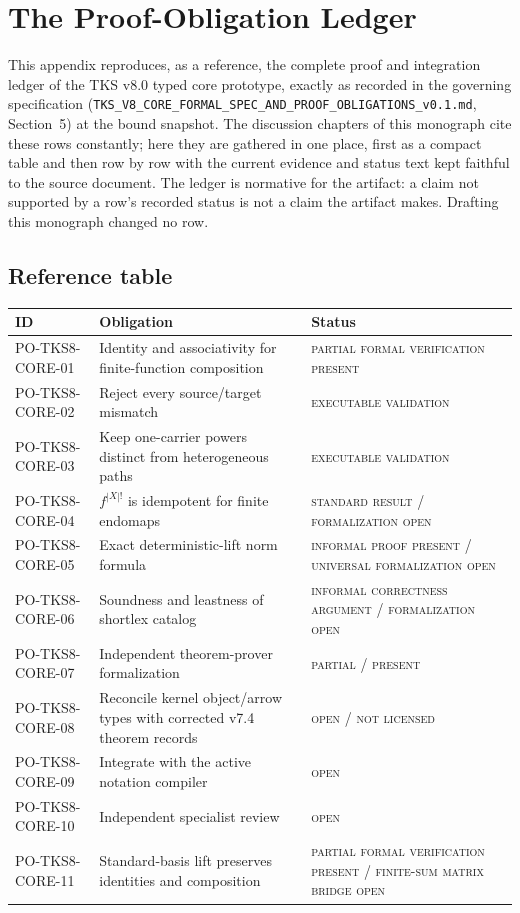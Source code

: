 \chapter{The Proof-Obligation Ledger}\label{appB:ledger}

This appendix reproduces, as a reference, the complete proof and
integration ledger of the TKS v8.0 typed core prototype, exactly as
recorded in the governing specification
(\texttt{TKS\_V8\_CORE\_FORMAL\_SPEC\_AND\_PROOF\_OBLIGATIONS\_v0.1.md},
Section~5) at the bound snapshot. The discussion chapters of this
monograph cite these rows constantly; here they are gathered in one
place, first as a compact table and then row by row with the current
evidence and status text kept faithful to the source document. The
ledger is normative for the artifact: a claim not supported by a row's
recorded status is not a claim the artifact makes. Drafting this
monograph changed no row.

\section{Reference table}\label{appB:sec:table}

\begin{longtable}{@{}lp{6.2cm}p{4.6cm}@{}}
\toprule
ID & Obligation & Status \\
\midrule
\endhead
PO-TKS8-CORE-01 & Identity and associativity for finite-function composition & \textsc{partial formal verification present} \\
\addlinespace
PO-TKS8-CORE-02 & Reject every source/target mismatch & \textsc{executable validation} \\
\addlinespace
PO-TKS8-CORE-03 & Keep one-carrier powers distinct from heterogeneous paths & \textsc{executable validation} \\
\addlinespace
PO-TKS8-CORE-04 & $f^{|X|!}$ is idempotent for finite endomaps & \textsc{standard result / formalization open} \\
\addlinespace
PO-TKS8-CORE-05 & Exact deterministic-lift norm formula & \textsc{informal proof present / universal formalization open} \\
\addlinespace
PO-TKS8-CORE-06 & Soundness and leastness of shortlex catalog & \textsc{informal correctness argument / formalization open} \\
\addlinespace
PO-TKS8-CORE-07 & Independent theorem-prover formalization & \textsc{partial / present} \\
\addlinespace
PO-TKS8-CORE-08 & Reconcile kernel object/arrow types with corrected v7.4 theorem records & \textsc{open / not licensed} \\
\addlinespace
PO-TKS8-CORE-09 & Integrate with the active notation compiler & \textsc{open} \\
\addlinespace
PO-TKS8-CORE-10 & Independent specialist review & \textsc{open} \\
\addlinespace
PO-TKS8-CORE-11 & Standard-basis lift preserves identities and composition & \textsc{partial formal verification present / finite-sum matrix bridge open} \\
\bottomrule
\end{longtable}

